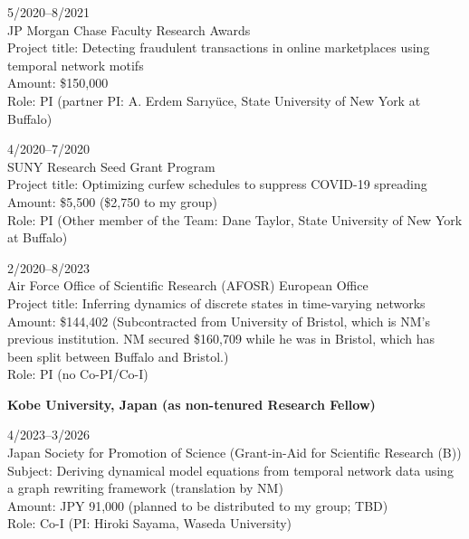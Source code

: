 \documentclass[11pt,letter]{article}
\renewenvironment{itemize}{
  \begin{list}{}{
    \setlength{\leftmargin}{1.5em}
    \setlength{\itemsep}{0.25em}
    \setlength{\parskip}{0pt}
    \setlength{\parsep}{0.25em}
  }
}{
  \end{list}
}
\begin{document}
\begin{itemize}
\item 
5/2020--8/2021\\
JP Morgan Chase Faculty Research Awards\\
Project title: Detecting fraudulent transactions in online marketplaces using temporal network motifs\\
Amount: \$150,000\\
Role: PI (partner PI: A. Erdem Sar{\i}y\"{u}ce, State University of New York at Buffalo)

\item 
4/2020--7/2020\\
SUNY Research Seed Grant Program\\
Project title: Optimizing curfew schedules to suppress COVID-19 spreading\\
Amount: \$5,500 (\$2,750 to my group)\\
Role: PI (Other member of the Team: Dane Taylor, State University of New York at Buffalo)

\item 
2/2020--8/2023\\
Air Force Office of Scientific Research (AFOSR) European Office\\
Project title: Inferring dynamics of discrete states in time-varying networks\\
Amount: \$144,402 (Subcontracted from University of Bristol, which is NM's previous institution. NM secured \$160,709 while he was in Bristol, which has been split between Buffalo and Bristol.)\\
Role: PI (no Co-PI/Co-I)

\item \textbf{Kobe University, Japan (as non-tenured Research Fellow)}

\item 4/2023--3/2026\\
Japan Society for Promotion of Science (Grant-in-Aid for Scientific Research (B))\\
Subject: Deriving dynamical model equations from temporal network data using a graph rewriting framework (translation by NM)\\
Amount: JPY 91,000 (planned to be distributed to my group; TBD)\\ %
Role: Co-I  (PI: Hiroki Sayama, Waseda University)


\end{itemize}
\end{document}
